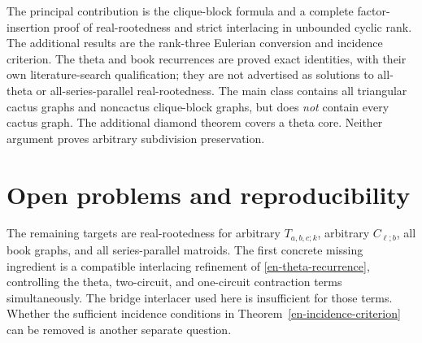 \documentclass[12pt]{amsart}
\theoremstyle{definition}
\theoremstyle{remark}
\numberwithin{equation}{section}
\begin{document}
The principal contribution is the clique-block formula and a complete factor-insertion proof of real-rootedness and strict interlacing in unbounded cyclic rank. The additional results are the rank-three Eulerian conversion and incidence criterion. The theta and book recurrences are proved exact identities, with their own literature-search qualification; they are not advertised as solutions to all-theta or all-series-parallel real-rootedness. The main class contains all triangular cactus graphs and noncactus clique-block graphs, but does \emph{not} contain every cactus graph. The additional diamond theorem covers a theta core. Neither argument proves arbitrary subdivision preservation.

\section{Open problems and reproducibility}
The remaining targets are real-rootedness for arbitrary $T_{a,b,c;k}$, arbitrary $C_{\boldsymbol\ell;b}$, all book graphs, and all series-parallel matroids. The first concrete missing ingredient is a compatible interlacing refinement of \eqref{en-theta-recurrence}, controlling the theta, two-circuit, and one-circuit contraction terms simultaneously. The bridge interlacer used here is insufficient for those terms. Whether the sufficient incidence conditions in Theorem~\ref{en-incidence-criterion} can be removed is another separate question.
\end{document}
